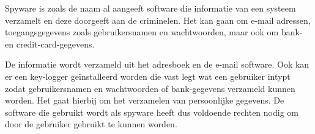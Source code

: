 Spyware is zoals de naam al aangeeft software die informatie van een systeem verzamelt en deze doorgeeft aan de criminelen. Het kan gaan om e-mail adressen, toegangsgegevens zoals gebruikersnamen en wachtwoorden, maar ook om bank- en credit-card-gegevens.

De informatie wordt verzameld uit het adresboek en de e-mail software. Ook kan er een key-logger ge\"installeerd worden die vast legt wat een gebruiker intypt zodat gebruikersnamen en wachtwoorden of bank-gegevens verzameld kunnen worden. Het gaat hierbij om het verzamelen van persoonlijke gegevens. De software die gebruikt wordt als spyware heeft dus voldoende rechten nodig om door de gebruiker gebruikt te kunnen worden.

